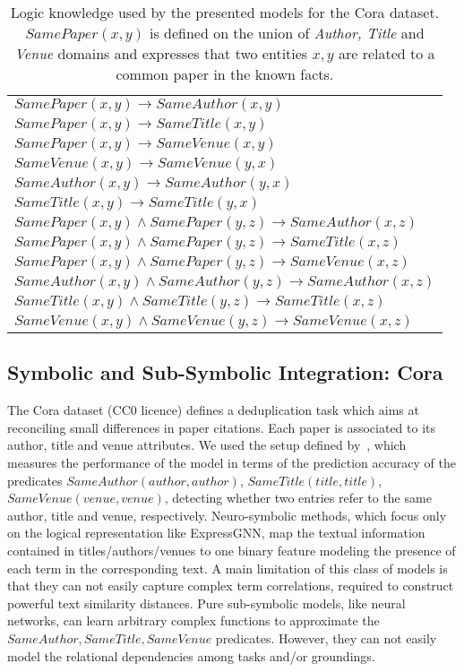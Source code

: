 \documentclass[journal]{IEEEtran}
\begin{document}
\begin{table}[t]
\centering
\caption{Logic knowledge used by the presented models for the Cora dataset. $SamePaper(x,y)$ is defined on the union of \emph{Author, Title} and \emph{Venue} domains and expresses that two entities $x,y$ are related to a common paper in the known facts.}
{\tiny
\begin{tabular}{l}
\small $SamePaper(x,y) \rightarrow SameAuthor(x,y)$ \\
\small $SamePaper(x,y) \rightarrow SameTitle(x,y)$ \\
\small $SamePaper(x,y) \rightarrow SameVenue(x,y)$ \\
\small $SameVenue(x,y) \rightarrow SameVenue(y,x)$ \\
\small $SameAuthor(x,y) \rightarrow SameAuthor(y,x)$ \\
\small $SameTitle(x,y) \rightarrow SameTitle(y,x)$\\
\small $SamePaper(x,y) \!\land\! SamePaper(y,z) \!\rightarrow\! SameAuthor(x,z)$ \\
\small $SamePaper(x,y) \!\land\! SamePaper(y,z) \!\rightarrow\! SameTitle(x,z)$ \\
\small $SamePaper(x,y) \!\land\! SamePaper(y,z) \!\rightarrow\! SameVenue(x,z)$ \\      
\small $SameAuthor(x,y) \!\land\! SameAuthor(y,z) \!\!\rightarrow\!\! SameAuthor(x,z)$\\
\small $SameTitle(x,y) \!\land\! SameTitle(y,z) \!\rightarrow\! SameTitle(x,z)$\\
\small $SameVenue(x,y) \!\land\! SameVenue(y,z) \!\rightarrow\! SameVenue(x,z)$
\end{tabular}
}
\label{tab:cora_rules}
\end{table} 

\subsection{Symbolic and Sub-Symbolic Integration: Cora}
\label{sec:cora}
The Cora dataset \cite{singla2005discriminative} (CC0 licence) defines a deduplication task which aims at reconciling small differences in paper citations. Each paper is associated to its author, title and venue attributes.
We used the setup defined by~\cite{zhang2020efficient}, which
measures the performance of the model in terms of the prediction accuracy of the predicates $SameAuthor(author, author)$, $SameTitle(title, title)$, $SameVenue(venue, venue)$, detecting whether two entries refer to the same author, title and venue, respectively.
Neuro-symbolic methods, which focus only on the logical representation like ExpressGNN, map the textual information contained in titles/authors/venues to one binary feature modeling the presence of each term in the corresponding text. A main limitation of this class of models is that they can not easily capture complex term correlations, required to construct powerful text similarity distances.
Pure sub-symbolic models, like neural networks, can learn arbitrary complex functions to approximate the $SameAuthor,SameTitle,SameVenue$ predicates. However, they can not easily model the relational dependencies among tasks and/or groundings.
\end{document}
